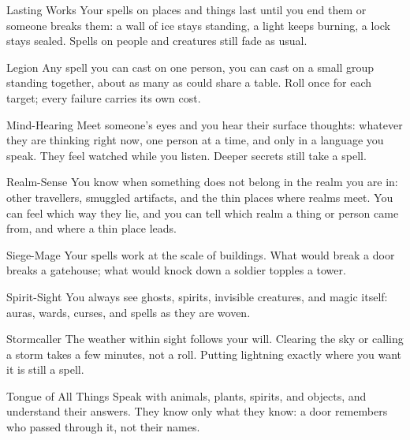 \begin{feat}{Lasting Works}
Your spells on places and things last until you end them or someone
breaks them: a wall of ice stays standing, a light keeps burning, a
lock stays sealed. Spells on people and creatures still fade as usual.
\end{feat}

\begin{feat}{Legion}
Any spell you can cast on one person, you can cast on a small group
standing together, about as many as could share a table. Roll once for
each target; every failure carries its own cost.
\end{feat}

\begin{feat}{Mind-Hearing}
Meet someone's eyes and you hear their surface thoughts: whatever they
are thinking right now, one person at a time, and only in a language
you speak. They feel watched while you listen. Deeper secrets still
take a spell.
\end{feat}

\begin{feat}{Realm-Sense}
You know when something does not belong in the realm you are in: other
travellers, smuggled artifacts, and the thin places where realms meet.
You can feel which way they lie, and you can tell which realm a thing
or person came from, and where a thin place leads.
\end{feat}

\begin{feat}{Siege-Mage}
Your spells work at the scale of buildings. What would break a door
breaks a gatehouse; what would knock down a soldier topples a tower.
\end{feat}

\begin{feat}{Spirit-Sight}
You always see ghosts, spirits, invisible creatures, and magic itself:
auras, wards, curses, and spells as they are woven.
\end{feat}

\begin{feat}{Stormcaller}
The weather within sight follows your will. Clearing the sky or calling
a storm takes a few minutes, not a roll. Putting lightning exactly where
you want it is still a spell.
\end{feat}

\begin{feat}{Tongue of All Things}
Speak with animals, plants, spirits, and objects, and understand their
answers. They know only what they know: a door remembers who passed
through it, not their names.
\end{feat}

